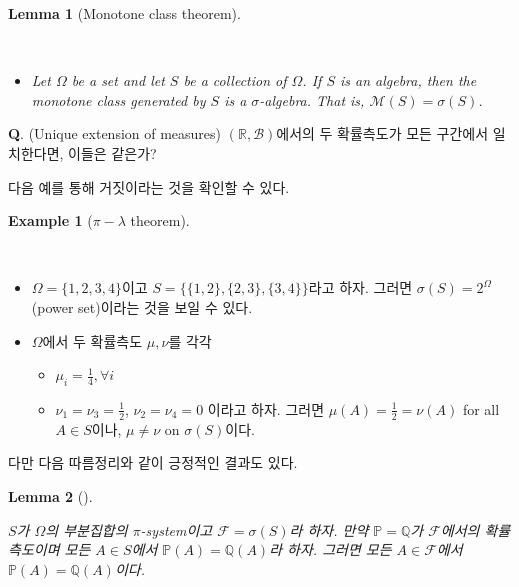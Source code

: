 \documentclass[
  13pt,
  letterpaper,
  DIV=11,
  numbers=noendperiod]{scrreprt}
\providecommand{\tightlist}{%
  \setlength{\itemsep}{0pt}\setlength{\parskip}{0pt}}\usepackage{longtable,booktabs,array}
\theoremstyle{plain}
\theoremstyle{definition}
\newtheorem{example}{Example}[chapter]
\theoremstyle{definition}
\theoremstyle{plain}
\newtheorem{lemma}{Lemma}[chapter]
\theoremstyle{definition}
\theoremstyle{plain}
\theoremstyle{remark}
\begin{document}
\begin{lemma}[Monotone class
theorem]\protect\hypertarget{lem-monotoneclassthm}{}\label{lem-monotoneclassthm}

~

\begin{itemize}
\tightlist
\item
  Let \(\Omega\) be a set and let \(S\) be a collection of \(\Omega\).
  If \(S\) is an algebra, then the monotone class generated by \(S\) is
  a \(\sigma\)-algebra. That is, \(\mathcal{M}(S) = \sigma(S)\).
\end{itemize}

\end{lemma}

\textbf{Q}. (Unique extension of measures)
\((\mathbb{R}, \mathcal{B})\)에서의 두 확률측도가 모든 구간에서
일치한다면, 이들은 같은가?

다음 예를 통해 거짓이라는 것을 확인할 수 있다.

\begin{example}[\(\pi-\lambda\)
theorem]\protect\hypertarget{exm-differentprobmeasures}{}\label{exm-differentprobmeasures}

~

\begin{itemize}
\item
  \(\Omega = \{1,2,3,4\}\)이고 \(S = \{\{1,2\},\{2,3\},\{3,4\}\}\)라고
  하자. 그러면 \(\sigma (S) = 2^{\Omega}\) (power set)이라는 것을 보일
  수 있다.
\item
  \(\Omega\)에서 두 확률측도 \(\mu, \nu\)를 각각

  \begin{itemize}
  \tightlist
  \item
    \(\mu_i = \frac{1}{4}, \forall i\)
  \item
    \(\nu_1 = \nu_3 =\frac{1}{2}\), \(\nu_2 = \nu_4 = 0\) 이라고 하자.
    그러면 \(\mu(A)=\frac{1}{2}=\nu (A)\) for all \(A \in S\)이나,
    \(\mu \neq \nu\) on \(\sigma (S)\)이다.
  \end{itemize}
\end{itemize}

\end{example}

다만 다음 따름정리와 같이 긍정적인 결과도 있다.

\begin{lemma}[]\protect\hypertarget{lem-pisysequivprob}{}\label{lem-pisysequivprob}

\(S\)가 \(\Omega\)의 부분집합의 \(\pi\)-system이고
\(\mathcal{F} = \sigma (S)\)라 하자. 만약 \(\mathbb{P} = \mathbb{Q}\)가
\(\mathcal{F}\)에서의 확률측도이며 모든 \(A \in S\)에서
\(\mathbb{P}(A) =\mathbb{Q}(A)\)라 하자. 그러면 모든
\(A\in \mathcal{F}\)에서 \(\mathbb{P}(A) =\mathbb{Q}(A)\)이다.

\end{lemma}
\end{document}
